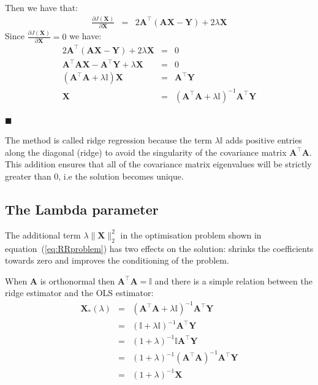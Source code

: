 Then we have that:
\begin{eqnarray*}
\frac{\partial J(\mathbf{\mathbf{X}})}{\partial \mathbf{X}}&=& 
 2\mathbf{A}^\top(\mathbf{A}\mathbf{X}-\mathbf{Y}) + 2\lambda\mathbf{X}
\end{eqnarray*}
Since $\frac{\partial J(\mathbf{\mathbf{X}})}{\partial \mathbf{X}}=0$ we have:
\begin{eqnarray*}
2\mathbf{A}^\top(\mathbf{A}\mathbf{X}-\mathbf{Y}) + 2\lambda\mathbf{X}&=&0 \\
\mathbf{A}^\top\mathbf{A}\mathbf{X} - \mathbf{A}^\top\mathbf{Y} + \lambda\mathbf{X} &=& 0\\
(\mathbf{A}^\top\mathbf{A}+\lambda\mathbb{I})\mathbf{X} &=&  \mathbf{A}^\top\mathbf{Y} \\
\mathbf{X} &=& (\mathbf{A}^\top\mathbf{A}+\lambda\mathbb{I})^{-1}  \mathbf{A}^\top\mathbf{Y}
\end{eqnarray*}

$\blacksquare$


The method is called ridge regression because the term $\lambda \mathbb{I}$ adds positive entries along the diagonal (ridge) to avoid the
singularity of the covariance matrix $\mathbf{A}^\top \mathbf{A}$. This addition ensures that all of the covariance matrix eigenvalues will be strictly greater than 0, i.e the solution becomes unique.

\subsection{The Lambda parameter}

The additional term $\lambda \|\mathbf{\mathbf{X}}\|_2^2$ in the optimisation
problem shown in equation~(\ref{eq:RRproblem}) has two effects on the solution:
shrinks the coefficients towards zero and improves the conditioning of the
problem.

When $\mathbf{A}$ is orthonormal then $\mathbf{A}^\top \mathbf{A} =\mathbb{I}$ and there is a simple relation between the ridge estimator and the OLS estimator:
\begin{eqnarray*}
\mathbf{X}_* (\lambda) &=& (\mathbf{A}^\top \mathbf{A}+\lambda \mathbb{I})^{-1}\mathbf{A}^\top \mathbf{Y} \\
 &=& (\mathbb{I} + \lambda \mathbb{I})^{-1} \mathbf{A}^\top \mathbf{Y} \\
 &=&(1+\lambda)^{-1} \mathbb{I} \mathbf{A}^\top \mathbf{Y} \\
 &=&(1+\lambda)^{-1} (\mathbf{A}^\top \mathbf{A})^{-1}\mathbf{A}^\top \mathbf{Y} \\
 &=&(1+\lambda)^{-1} \mathbf{X}
\end{eqnarray*}

